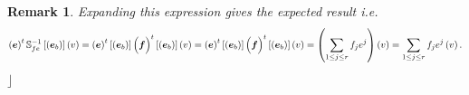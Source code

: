 \documentclass[aps,preprint]{revtex4}
\newtheorem{remark}[theorem]{Remark}
\begin{document}
\begin{enumerate}
\begin{enumerate}
\begin{remark}
Expanding this expression gives the expected result i.e. 
\begin{equation}
\left( \boldsymbol{e}\right) ^{t}\mathbb{S}_{fe}^{-1}\left[ \left( 
\boldsymbol{e}_{b}\right) \right] \left( v\right) =\left( \boldsymbol{e}%
\right) ^{t}\left[ \left( \overset{}{\boldsymbol{e}_{b}}\right) \right]
\left( \overset{}{\boldsymbol{f}}\right) ^{t}\left[ \left( \boldsymbol{e}%
_{b}\right) \right] \left( v\right) =\left( \boldsymbol{e}\right) ^{t}\left[
\left( \overset{}{\boldsymbol{e}_{b}}\right) \right] \left( \overset{}{%
\boldsymbol{f}}\right) ^{t}\left[ \left( \boldsymbol{e}_{b}\right) \right]
\left( v\right) =\left( \sum_{1\leq j\leq r}f_{j}e^{j}\right) \left(
v\right) =\sum_{1\leq j\leq r}f_{j}e^{j}\left( v\right) .
\end{equation}%
$\rfloor $
\end{remark}


\end{enumerate}
\end{enumerate}
\end{document}
